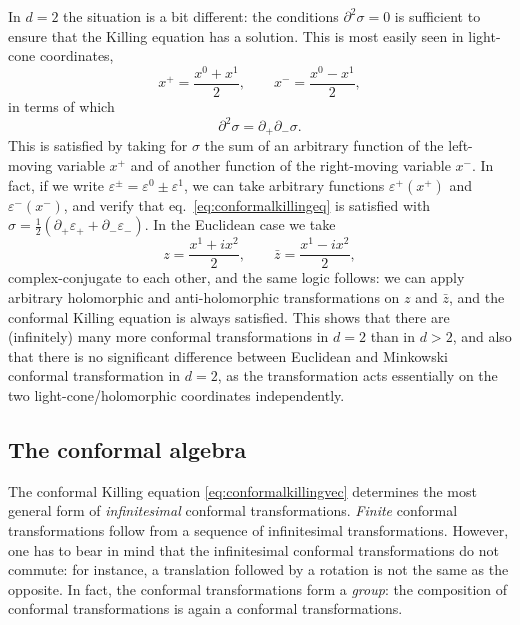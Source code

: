 \documentclass[a4paper,12pt]{article}
\numberwithin{equation}{section}
\begin{document}
In $d = 2$ the situation is a bit different: the conditions $\partial^2 \sigma = 0$ is sufficient to ensure that the Killing equation has a solution. This is most easily seen in light-cone coordinates,
\begin{equation}
	x^+ = \frac{x^0 + x^1}{2},
	\qquad
	x^- = \frac{x^0 - x^1}{2},
\end{equation}
in terms of which
\begin{equation}
	\partial^2 \sigma = \partial_+ \partial_- \sigma.
\end{equation}
This is satisfied by taking for $\sigma$ the sum of an arbitrary function of the left-moving variable $x^+$ and of another function of the right-moving variable $x^-$. In fact, if we write $\varepsilon^\pm = \varepsilon^0 \pm \varepsilon^1$, we can 	take arbitrary functions $\varepsilon^+(x^+)$ and $\varepsilon^-(x^-)$, and verify that eq.~\eqref{eq:conformalkillingeq} is satisfied with $\sigma = \frac{1}{2} \left( \partial_+ \varepsilon_+ + \partial_- \varepsilon_- \right)$.
In the Euclidean case we take
\begin{equation}
	z = \frac{x^1 + i x^2}{2},
	\qquad
	\bar{z} = \frac{x^1 - i x^2}{2},
\end{equation}
complex-conjugate to each other, and the same logic follows: we can apply arbitrary holomorphic and anti-holomorphic transformations on $z$ and $\bar{z}$, and the conformal Killing equation is always satisfied. This shows that there are (infinitely) many more conformal transformations in $d = 2$ than in $d > 2$, and also that there is no significant difference between Euclidean and Minkowski conformal transformation in $d = 2$, as the transformation acts essentially on the two light-cone/holomorphic coordinates independently.


\subsection{The conformal algebra}

The conformal Killing equation \eqref{eq:conformalkillingvec} determines the most general form of \emph{infinitesimal} conformal transformations. \emph{Finite} conformal transformations follow from a sequence of infinitesimal transformations.
However, one has to bear in mind that the infinitesimal conformal transformations do not commute: for instance, a translation followed by a rotation is not the same as the opposite.
In fact, the conformal transformations form a \emph{group}: the composition of conformal transformations is again a conformal transformations.
\end{document}
